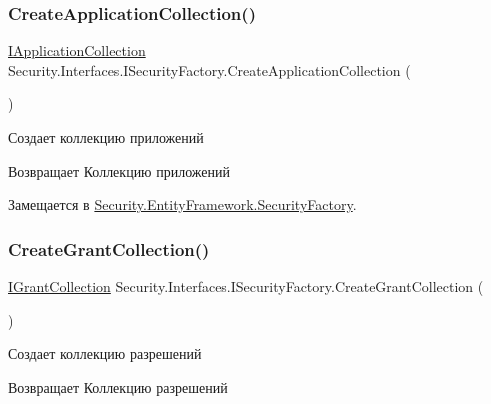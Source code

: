 \subsubsection{\texorpdfstring{Create\+Application\+Collection()}{CreateApplicationCollection()}}
{\footnotesize\ttfamily \hyperlink{interface_security_1_1_interfaces_1_1_collections_1_1_i_application_collection}{I\+Application\+Collection} Security.\+Interfaces.\+I\+Security\+Factory.\+Create\+Application\+Collection (\begin{DoxyParamCaption}{ }\end{DoxyParamCaption})}



Создает коллекцию приложений 

\begin{DoxyReturn}{Возвращает}
Коллекцию приложений
\end{DoxyReturn}


Замещается в \hyperlink{class_security_1_1_entity_framework_1_1_security_factory_a7aa2131411cce5dd03bdea9e615be18d}{Security.\+Entity\+Framework.\+Security\+Factory}.

\mbox{\label{interface_security_1_1_interfaces_1_1_i_security_factory_aaf6f0d74a597fc683462caa7900c363b}} 
\subsubsection{\texorpdfstring{Create\+Grant\+Collection()}{CreateGrantCollection()}}
{\footnotesize\ttfamily \hyperlink{interface_security_1_1_interfaces_1_1_collections_1_1_i_grant_collection}{I\+Grant\+Collection} Security.\+Interfaces.\+I\+Security\+Factory.\+Create\+Grant\+Collection (\begin{DoxyParamCaption}{ }\end{DoxyParamCaption})}



Создает коллекцию разрешений 

\begin{DoxyReturn}{Возвращает}
Коллекцию разрешений
\end{DoxyReturn}


